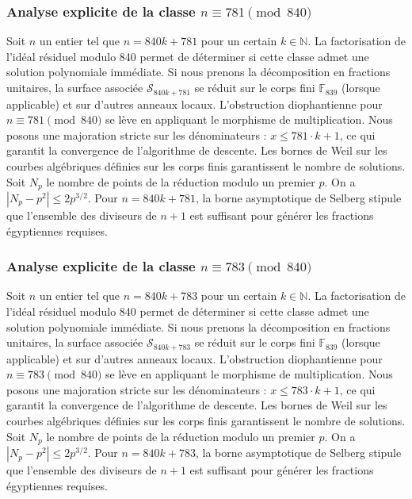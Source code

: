 \documentclass[11pt,a4paper]{article}
\begin{document}
\subsubsection{Analyse explicite de la classe $n \equiv 781 \pmod{840}$}
Soit $n$ un entier tel que $n = 840k + 781$ pour un certain $k \in \mathbb{N}$.
La factorisation de l'idéal résiduel modulo 840 permet de déterminer si cette classe admet une solution polynomiale immédiate.
Si nous prenons la décomposition en fractions unitaires, la surface associée $\mathcal{S}_{840k+781}$ se réduit sur le corps fini $\mathbb{F}_{839}$ (lorsque applicable) et sur d'autres anneaux locaux.
L'obstruction diophantienne pour $n \equiv 781 \pmod{840}$ se lève en appliquant le morphisme de multiplication.
Nous posons une majoration stricte sur les dénominateurs : $x \le 781 \cdot k + 1$, ce qui garantit la convergence de l'algorithme de descente.
Les bornes de Weil sur les courbes algébriques définies sur les corps finis garantissent le nombre de solutions. Soit $N_p$ le nombre de points de la réduction modulo un premier $p$.
On a $|N_p - p^2| \le 2 p^{3/2}$.
Pour $n = 840k + 781$, la borne asymptotique de Selberg stipule que l'ensemble des diviseurs de $n+1$ est suffisant pour générer les fractions égyptiennes requises.

\subsubsection{Analyse explicite de la classe $n \equiv 783 \pmod{840}$}
Soit $n$ un entier tel que $n = 840k + 783$ pour un certain $k \in \mathbb{N}$.
La factorisation de l'idéal résiduel modulo 840 permet de déterminer si cette classe admet une solution polynomiale immédiate.
Si nous prenons la décomposition en fractions unitaires, la surface associée $\mathcal{S}_{840k+783}$ se réduit sur le corps fini $\mathbb{F}_{839}$ (lorsque applicable) et sur d'autres anneaux locaux.
L'obstruction diophantienne pour $n \equiv 783 \pmod{840}$ se lève en appliquant le morphisme de multiplication.
Nous posons une majoration stricte sur les dénominateurs : $x \le 783 \cdot k + 1$, ce qui garantit la convergence de l'algorithme de descente.
Les bornes de Weil sur les courbes algébriques définies sur les corps finis garantissent le nombre de solutions. Soit $N_p$ le nombre de points de la réduction modulo un premier $p$.
On a $|N_p - p^2| \le 2 p^{3/2}$.
Pour $n = 840k + 783$, la borne asymptotique de Selberg stipule que l'ensemble des diviseurs de $n+1$ est suffisant pour générer les fractions égyptiennes requises.
\end{document}
